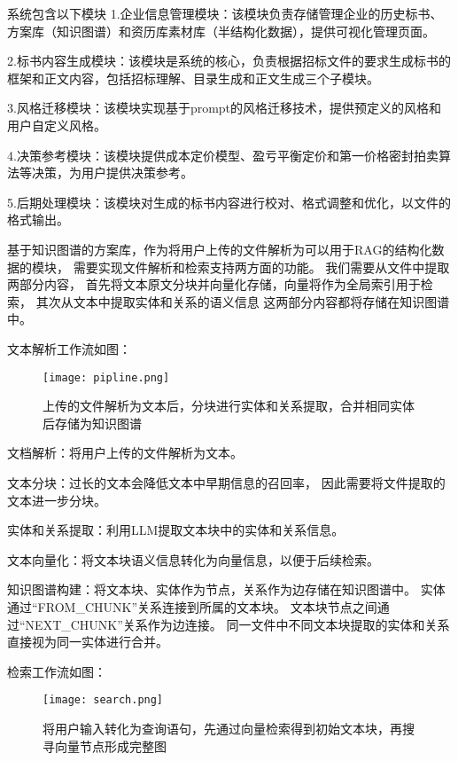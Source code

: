 \documentclass{xmu}
\begin{document}
系统包含以下模块
1.企业信息管理模块：该模块负责存储管理企业的历史标书、方案库（知识图谱）和资历库素材库（半结构化数据），提供可视化管理页面。

2.标书内容生成模块：该模块是系统的核心，负责根据招标文件的要求生成标书的框架和正文内容，包括招标理解、目录生成和正文生成三个子模块。

3.风格迁移模块：该模块实现基于prompt的风格迁移技术，提供预定义的风格和用户自定义风格。

4.决策参考模块：该模块提供成本定价模型、盈亏平衡定价和第一价格密封拍卖算法等决策，为用户提供决策参考。

5.后期处理模块：该模块对生成的标书内容进行校对、格式调整和优化，以文件的格式输出。


基于知识图谱的方案库，作为将用户上传的文件解析为可以用于RAG的结构化数据的模块，
需要实现文件解析和检索支持两方面的功能。
我们需要从文件中提取两部分内容，
首先将文本原文分块并向量化存储，向量将作为全局索引用于检索，
其次从文本中提取实体和关系的语义信息
这两部分内容都将存储在知识图谱中。

文本解析工作流如图：

\begin{figure}[!htb]
    \centering
    \texttt{[image: pipline.png]}\\
    \caption{上传的文件解析为文本后，分块进行实体和关系提取，合并相同实体后存储为知识图谱}\label{}
\end{figure}

文档解析：将用户上传的文件解析为文本。\par
文本分块：过长的文本会降低文本中早期信息的召回率\cite{Long}，
因此需要将文件提取的文本进一步分块。\par
实体和关系提取：利用LLM提取文本块中的实体和关系信息。\par
文本向量化：将文本块语义信息转化为向量信息，以便于后续检索。\par
知识图谱构建：将文本块、实体作为节点，关系作为边存储在知识图谱中。
实体通过“FROM\_CHUNK”关系连接到所属的文本块。
文本块节点之间通过“NEXT\_CHUNK”关系作为边连接。
同一文件中不同文本块提取的实体和关系直接视为同一实体进行合并。

检索工作流如图：

\begin{figure}[!htb]
    \centering
    \texttt{[image: search.png]}\\
    \caption{将用户输入转化为查询语句，先通过向量检索得到初始文本块，再搜寻向量节点形成完整图}\label{}
\end{figure}
\end{document}

